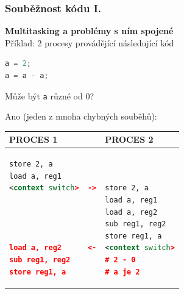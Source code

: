 \documentclass[xcolor=dvipsnames]{beamer}
\newcommand{\heading}[1]{\textbf{\textcolor{BurntOrange}{#1}}}
\begin{document}
\begin{frame}[fragile]
  \frametitle{Souběžnost kódu I.}
  \heading{Multitasking a problémy s ním spojené} \\
  Příklad: 2 procesy provádějící následující kód
  \begin{lstlisting}[language=C]
a = 2;
a = a - a;
  \end{lstlisting}
  Může být \texttt{a} různé od 0?

  \pause
  \medskip

  Ano (jeden z mnoha chybných souběhů):
  \begin{center}
  \begin{tabular}{ll}
PROCES 1 & PROCES 2 \\ \hline
  \begin{lstlisting}[language=XML]
store 2, a
load a, reg1
<context switch>  ->




load a, reg2      <-
sub reg1, reg2
store reg1, a
  \end{lstlisting} &
  \begin{lstlisting}[language=XML]


store 2, a
load a, reg1
load a, reg2
sub reg1, reg2
store reg1, a
<context switch>
# 2 - 0
# a je 2
  \end{lstlisting}
  \end{tabular}
  \end{center}

\end{frame}
\end{document}
